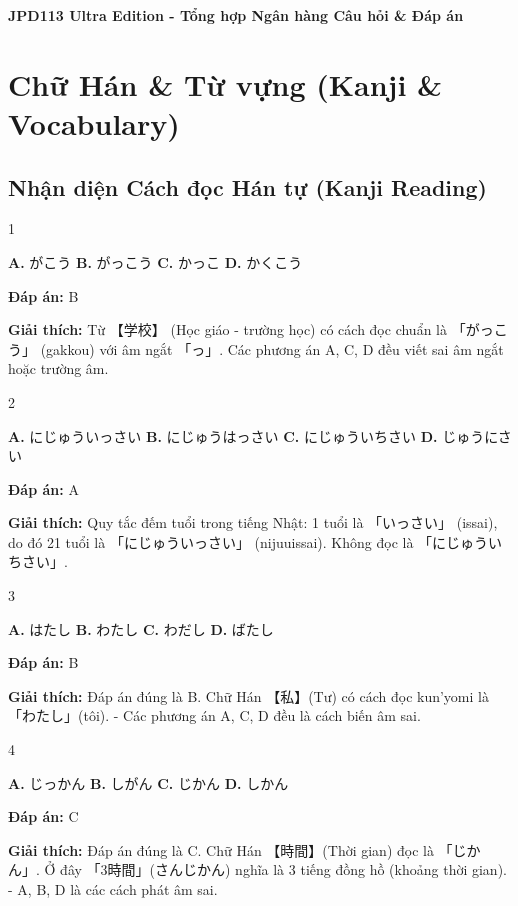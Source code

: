 \documentclass[12pt,a4paper]{report}
\newcommand{\examtitle}[1]{\begin{center}\Huge\bfseries #1\end{center}\vspace{1cm}}
\newcommand{\source}[1]{}
\newcommand{\choice}[2]{\textbf{#1.} #2 \quad}
\newcommand{\answer}[1]{\par\textbf{Đáp án:} #1}
\newcommand{\confidence}[1]{}
\newcommand{\explain}[1]{\par\textbf{Giải thích:} #1\vspace{0.5cm}}
\begin{document}
\examtitle{JPD113 Ultra Edition - Tổng hợp Ngân hàng Câu hỏi & Đáp án}

\tableofcontents
\newpage

\chapter{Chữ Hán \& Từ vựng (Kanji \& Vocabulary)}

\section{Nhận diện Cách đọc Hán tự (Kanji Reading)}
\begin{question}{1}
\source{Q1_1_20251121082846.webp}
\choice{A}{がこう}
\choice{B}{がっこう}
\choice{C}{かっこ}
\choice{D}{かくこう}
\answer{B}
\confidence{high}
\explain{Từ 【学校】 (Học giáo - trường học) có cách đọc chuẩn là 「がっこう」 (gakkou) với âm ngắt 「っ」. Các phương án A, C, D đều viết sai âm ngắt hoặc trường âm.}
\end{question}

\begin{question}{2}
\source{Q26_71_20251121082837.webp}
\choice{A}{にじゅういっさい}
\choice{B}{にじゅうはっさい}
\choice{C}{にじゅういちさい}
\choice{D}{じゅうにさい}
\answer{A}
\confidence{high}
\explain{Quy tắc đếm tuổi trong tiếng Nhật: 1 tuổi là 「いっさい」 (issai), do đó 21 tuổi là 「にじゅういっさい」 (nijuuissai). Không đọc là 「にじゅういちさい」.}
\end{question}

\begin{question}{3}
\source{6.webp}
\choice{A}{はたし}
\choice{B}{わたし}
\choice{C}{わだし}
\choice{D}{ばたし}
\answer{B}
\confidence{high}
\explain{Đáp án đúng là B. Chữ Hán 【私】(Tư) có cách đọc kun'yomi là 「わたし」(tôi).
- Các phương án A, C, D đều là cách biến âm sai.}
\end{question}

\begin{question}{4}
\source{19.webp}
\choice{A}{じっかん}
\choice{B}{しがん}
\choice{C}{じかん}
\choice{D}{しかん}
\answer{C}
\confidence{high}
\explain{Đáp án đúng là C. Chữ Hán 【時間】(Thời gian) đọc là 「じかん」. Ở đây 「3時間」(さんじかん) nghĩa là 3 tiếng đồng hồ (khoảng thời gian).
- A, B, D là các cách phát âm sai.}
\end{question}
\end{document}
